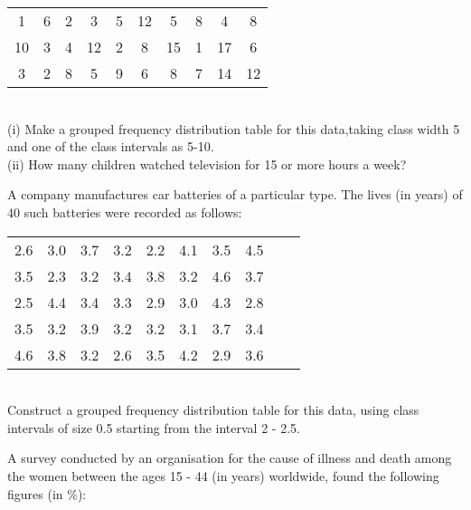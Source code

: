 \begin{tabular}{ cccccccccc } 
 1 &6 &2 &3 &5 &12 &5 &8 &4 &8  \\ 
 10 &3 &4 &12 &2 &8 &15 &1 &17 &6\\ 
 3 &2 &8 &5 &9 &6 &8 &7 &14 &12\\ 
\end{tabular}\\
(i) Make a grouped frequency distribution table for this data,taking class width 5 and one of the class intervals as 5-10.\\
(ii)  How many children watched television for 15 or more hours a week?\\
\item A company manufactures car batteries of a particular type. The lives (in years) of 40 such batteries were recorded as follows:\\
\begin{tabular}{ cccccccccc } 
 2.6 &3.0 &3.7 &3.2 &2.2 &4.1 &3.5 &4.5 \\ 
 3.5 &2.3 &3.2 &3.4 &3.8 &3.2 &4.6 &3.7\\ 
 2.5 &4.4 &3.4 &3.3 &2.9 &3.0 &4.3 &2.8\\ 
 3.5 &3.2 &3.9 &3.2 &3.2 &3.1 &3.7 &3.4\\ 
 4.6 &3.8 &3.2 &2.6 &3.5 &4.2 &2.9 &3.6\\ 
\end{tabular}\\
Construct a grouped frequency distribution table for this data, using class intervals of size 0.5 starting from the interval 2 - 2.5.\\
\item A survey conducted by an organisation for the cause of illness and death among the women between the ages 15 - 44 (in years) worldwide, found the following figures (in $\%$):\\

